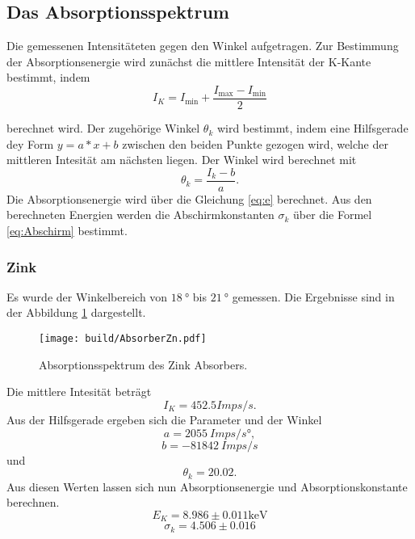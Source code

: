 \subsection{Das Absorptionsspektrum}
Die gemessenen Intensitäteten gegen den Winkel aufgetragen.
Zur Bestimmung der Absorptionsenergie wird zunächst die mittlere Intensität der K-Kante bestimmt, indem 
\begin{equation}
    I_K = I_\text{min} + \frac{I_\text{max}- I_\text{min}}{2}
\end{equation}

\noindent berechnet wird. 
Der zugehörige Winkel $\theta_k$ wird bestimmt, indem eine Hilfsgerade dey Form $y = a * x+ b$ zwischen den beiden Punkte gezogen wird, welche der mittleren Intesität am nächsten liegen.
Der Winkel wird berechnet mit 
\begin{equation}
    \theta_k = \frac{I_k - b}{a}.
\end{equation}
Die Absorptionsenergie wird über die Gleichung \ref{eq:e} berechnet.
Aus den berechneten Energien werden die Abschirmkonstanten $\sigma_k$ über die Formel \ref{eq:Abschirm} bestimmt.


\subsubsection{Zink}
Es wurde der Winkelbereich von $\qty{18}{°}$ bis $\qty{21}{°}$ gemessen. 
Die Ergebnisse sind in der Abbildung \ref{fig:AbZn} dargestellt.
\begin{figure}[H]
    \centering
    \texttt{[image: build/AbsorberZn.pdf]}
    \caption{Absorptionsspektrum des Zink Absorbers.}
    \label{fig:AbZn}
\end{figure}
Die mittlere Intesität beträgt
\begin{equation*}
    I_K = 452.5 Imps/s.
\end{equation*}
Aus der Hilfsgerade ergeben sich die Parameter und der Winkel
\begin{equation*}
    a = \qty{2055}{Imps/s°} ,
\end{equation*}
\begin{equation*}
    b = \qty{-81842}{Imps/s}
\end{equation*}
und
\begin{equation*}
    \theta_k = 20.02.
\end{equation*}
Aus diesen Werten lassen sich nun  Absorptionsenergie und Absorptionskonstante berechnen.
\begin{equation*}
    E_K = 8.986 \pm 0.011\unit{\kilo\electronvolt}
\end{equation*}
\begin{equation*}
    \sigma_k = 4.506 \pm 0.016
\end{equation*}


